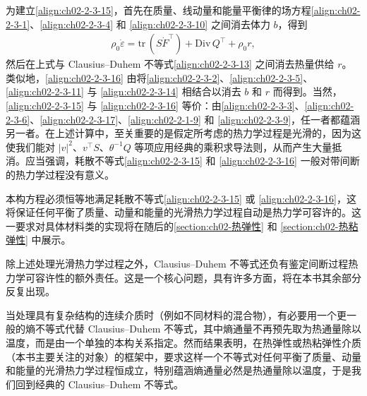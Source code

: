 ﻿\documentclass[../../main.tex]{subfiles}
\begin{document}
为建立\eqref{align:ch02-2-3-15}，首先在质量、线动量和能量平衡律的场方程\eqref{align:ch02-2-3-1}、\eqref{align:ch02-2-3-4} 和 \eqref{align:ch02-2-3-10} 之间消去体力 $b$，得到
\begin{align}
\rho_{0}\dot{\varepsilon}=\mathrm{tr}\,(S\dot{F}^{\top})+\mathrm{Div}\,Q^{\top}+\rho_{0}r,
\label{align:ch02-2-3-18}
\end{align}
然后在上式与 Clausius--Duhem 不等式\eqref{align:ch02-2-3-13} 之间消去热量供给 $r$。类似地，\eqref{align:ch02-2-3-16} 由将\eqref{align:ch02-2-3-2}、\eqref{align:ch02-2-3-5}、\eqref{align:ch02-2-3-11} 与 \eqref{align:ch02-2-3-14} 相结合以消去 $b$ 和 $r$ 而得到。当然，\eqref{align:ch02-2-3-15} 与 \eqref{align:ch02-2-3-16} 等价：由\eqref{align:ch02-2-3-3}、\eqref{align:ch02-2-3-6}、\eqref{align:ch02-2-3-17}、\eqref{align:ch02-2-1-9} 和 \eqref{align:ch02-2-3-9}，任一者都蕴涵另一者。在上述计算中，至关重要的是假定所考虑的热力学过程是光滑的，因为这使我们能对 $|v|^{2}$、$v^{\top}S$、$\theta^{-1}Q$ 等项应用经典的乘积求导法则，从而产生大量抵消。应当强调，耗散不等式\eqref{align:ch02-2-3-15} 和 \eqref{align:ch02-2-3-16} 一般对带间断的热力学过程没有意义。

本构方程必须恒等地满足耗散不等式\eqref{align:ch02-2-3-15} 或 \eqref{align:ch02-2-3-16}，这将保证任何平衡了质量、动量和能量的光滑热力学过程自动是热力学可容许的。这一要求对具体材料类的实现将在随后的\cref{section:ch02-热弹性} 和 \cref{section:ch02-热粘弹性} 中展示。

除上述处理光滑热力学过程之外，Clausius--Duhem 不等式还负有鉴定间断过程热力学可容许性的额外责任。这是一个核心问题，具有许多方面，将在本书其余部分反复出现。

当处理具有复杂结构的连续介质时（例如不同材料的混合物），有必要用一个更一般的熵不等式代替 Clausius--Duhem 不等式，其中熵通量不再预先取为热通量除以温度，而是由一个单独的本构关系指定。然而结果表明，在热弹性或热粘弹性介质（本书主要关注的对象）的框架中，要求这样一个不等式对任何平衡了质量、动量和能量的光滑热力学过程恒成立，特别蕴涵熵通量必然是热通量除以温度，于是我们回到经典的 Clausius--Duhem 不等式。
\end{document}
